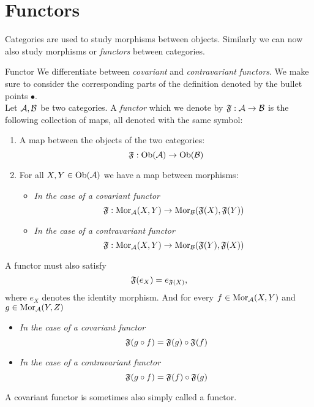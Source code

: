 \section{Functors}
Categories are used to study morphisms between objects. Similarly we can now also study morphisms or \emph{functors} between categories.


\begin{definition}{Functor}{}
We differentiate between \emph{covariant} and \emph{contravariant} \emph{functors}. 
We make sure to consider the corresponding parts of the definition denoted by the bullet points $\bullet$.\\

Let $\mathcal{A}, \mathcal{B}$ be two categories. A \emph{functor} which we denote by $\mathfrak{F}: \mathcal{A} \to \mathcal{B}$ is the following collection of maps, all denoted with the same symbol:
\begin{enumerate}
    \item A map between the objects of the two categories:
    $$
    \mathfrak{F}: \mathrm {Ob}(\mathcal{A}) \to \mathrm {Ob}(\mathcal{B})
    $$
    \item For all $X,Y \in \mathrm {Ob}(\mathcal{A})$ we have a map between morphisms: 
    \begin{itemize}
        \item \emph{In the case of a covariant functor} $$\mathfrak{F}: \mathrm {Mor}_{\mathcal{A}}(X,Y) \to \mathrm {Mor}_{\mathcal{B}}(\mathfrak{F}(X), \mathfrak{F}(Y))$$
        \item \emph{In the case of a contravariant functor} $$\mathfrak{F}: \mathrm {Mor}_{\mathcal{A}}(X,Y) \to \mathrm {Mor}_{\mathcal{B}}(\mathfrak{F}(Y), \mathfrak{F}(X))$$
    \end{itemize}
\end{enumerate}
A functor must also satisfy
\begin{equation}
\label{eq:functor_functoriality_identity}
\mathfrak{F}(e_X) = e_{\mathfrak{F}(X)},
\end{equation}
where $e_X$ denotes the identity morphism. And for every $f \in \mathrm {Mor}_{\mathcal{A}}(X,Y)$ and $g \in \mathrm {Mor}_{\mathcal{A}}(Y,Z)$
\begin{itemize}
    \item \emph{In the case of a covariant functor}
    \begin{equation}
    \label{eq:functor_functoriality_covar}
    \mathfrak{F}(g \circ f) = \mathfrak{F}(g) \circ \mathfrak{F}(f)
    \end{equation}
    
    \item \emph{In the case of a contravariant functor}
    \begin{equation}
    \label{eq:functor_functoriality_contravar}
    \mathfrak{F}(g \circ f) = \mathfrak{F}(f) \circ \mathfrak{F}(g)
    \end{equation}
\end{itemize}
A covariant functor is sometimes also simply called a functor.
\end{definition}


